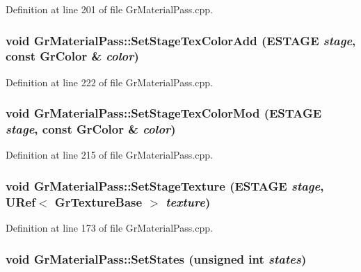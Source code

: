 Definition at line 201 of file GrMaterialPass.cpp.\hypertarget{class_gr_material_pass_ce347100ba76c2cbaadee8ee02baa4db}{
\subsubsection[{SetStageTexColorAdd}]{\setlength{\rightskip}{0pt plus 5cm}void GrMaterialPass::SetStageTexColorAdd ({\bf ESTAGE} {\em stage}, \/  const {\bf GrColor} \& {\em color})}}
\label{class_gr_material_pass_ce347100ba76c2cbaadee8ee02baa4db}




Definition at line 222 of file GrMaterialPass.cpp.\hypertarget{class_gr_material_pass_92554ebb8bec4354879389bd7d225d10}{
\subsubsection[{SetStageTexColorMod}]{\setlength{\rightskip}{0pt plus 5cm}void GrMaterialPass::SetStageTexColorMod ({\bf ESTAGE} {\em stage}, \/  const {\bf GrColor} \& {\em color})}}
\label{class_gr_material_pass_92554ebb8bec4354879389bd7d225d10}




Definition at line 215 of file GrMaterialPass.cpp.\hypertarget{class_gr_material_pass_4bb9f88d516c2798a43b068400212ded}{
\subsubsection[{SetStageTexture}]{\setlength{\rightskip}{0pt plus 5cm}void GrMaterialPass::SetStageTexture ({\bf ESTAGE} {\em stage}, \/  {\bf URef}$<$ {\bf GrTextureBase} $>$ {\em texture})}}
\label{class_gr_material_pass_4bb9f88d516c2798a43b068400212ded}




Definition at line 173 of file GrMaterialPass.cpp.\hypertarget{class_gr_material_pass_c0406c4ebc750d788d1d0c13f10e9203}{
\subsubsection[{SetStates}]{\setlength{\rightskip}{0pt plus 5cm}void GrMaterialPass::SetStates (unsigned int {\em states})}}
\label{class_gr_material_pass_c0406c4ebc750d788d1d0c13f10e9203}




